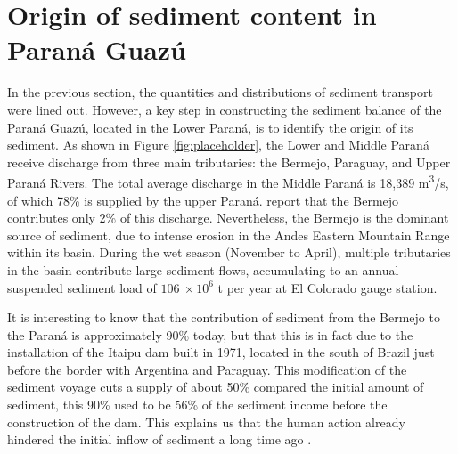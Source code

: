 \section{Origin of sediment content in Paraná Guazú}
\label{sec:origin sediment content}
In the previous section, the quantities and distributions of sediment transport were lined out. However, a key step in constructing the sediment balance of the Paraná Guazú, located in the Lower Paraná, is to identify the origin of its sediment. As shown in Figure \ref{fig:placeholder}, the Lower and Middle Paraná receive discharge from three main tributaries: the Bermejo, Paraguay, and Upper Paraná Rivers. The total average discharge in the Middle Paraná is 18,389 m\textsuperscript{3}/s, of which 78\% is supplied by the upper Paraná. \citeauthor{lopezweibelSourcesTemporalDynamics2022} report that the Bermejo contributes only 2\% of this discharge. Nevertheless, the Bermejo is the dominant source of sediment, due to intense erosion in the Andes Eastern Mountain Range within its basin. During the wet season (November to April), multiple tributaries in the basin contribute large sediment flows, accumulating to an annual suspended sediment load of $106 ~\times 10^6$ t per year at El Colorado gauge station. 

It is interesting to know that the contribution of sediment from the Bermejo to the Paraná is approximately 90\% today, but that this is in fact due to the installation of the Itaipu dam built in 1971, located in the south of Brazil just before the border with Argentina and Paraguay. This modification of the sediment voyage cuts a supply of about 50\% compared the initial amount of sediment, this 90\% used to be 56\% of the sediment income before the construction of the dam. This explains us that the human action already hindered the initial inflow of sediment a long time ago \autocite{hibaParanaRiverEcological2024}.

